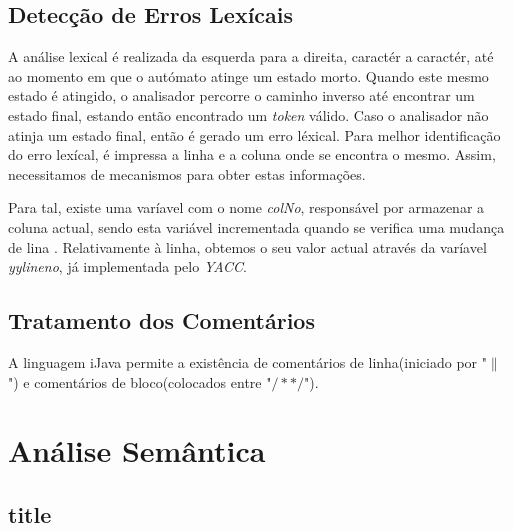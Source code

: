 \documentclass[11pt,a4paper]{article}
\begin{document}
\subsection{Detecção de Erros Lexícais}

A análise lexical é realizada da esquerda para a direita, caractér a caractér, até ao momento em que o autómato atinge um estado morto. Quando este mesmo estado é atingido, o analisador percorre o caminho inverso até encontrar um estado final, estando então encontrado um \emph{token} válido. Caso o analisador não atinja um estado final, então é gerado um erro léxical. Para melhor identificação do erro lexícal, é impressa a linha e a coluna onde se encontra o mesmo. Assim, necessitamos de mecanismos para obter estas informações.

Para tal, existe uma varíavel com o nome \emph{colNo}, responsável por armazenar a coluna actual, sendo esta variável incrementada quando se verifica uma mudança de lina . Relativamente à linha, obtemos o seu valor actual através da varíavel \emph{yylineno}, já implementada pelo \emph{YACC}.



\subsection{Tratamento dos Comentários}

A linguagem iJava permite a existência de comentários de linha(iniciado por "$\|$") e comentários de bloco(colocados entre "$/* */$").

\section{Análise Semântica}



\subsection{title}
   
\end{document}
